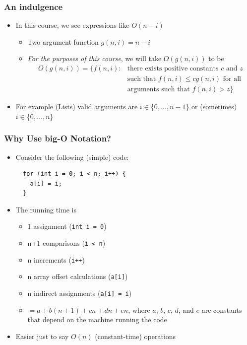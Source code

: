 \documentclass[xcolor=dvipsnames]{beamer}
\begin{document}
\begin{frame}
  \frametitle{An indulgence}

  \begin{itemize}
    \item In this course, we see expressions like $O(n-i)$
    \begin{itemize}
      \item Two argument function $g(n,i)=n-i$
      \item \emph{For the purposes of this course}, 
               we will take $O(g(n,i))$ to be
       \[ \begin{array}{ll} O(g(n,i)) = \{ f(n,i) : &
           \mbox{there exists positive constants $c$ and $z$} \\
           & \mbox{such that $f(n,i) \le cg(n,i)$ for all } \\
           & \mbox{arguments such that $f(n,i)>z$} \}\end{array} 
       \]
    \end{itemize}
    \item For example (Lists) valid arguments are $i\in\{0,\ldots,n-1\}$ or (sometimes) $i\in\{0,\ldots,n\}$
  \end{itemize}
\end{frame}

\begin{frame}[fragile]
  \frametitle{Why Use big-O Notation?}
   
  \begin{itemize}
    \item Consider the following (simple) code:
\begin{lstlisting}
  for (int i = 0; i < n; i++) {
    a[i] = i;
  } 
\end{lstlisting}
   \item<2-> The running time is 
   \begin{itemize}
      \item<3-> 1 assignment (\lstinline{int i = 0})
      \item<4-> n+1 comparisons (\lstinline{i < n})
      \item<5-> n increments (\lstinline{i++})
      \item<6-> n array offset calculations (\lstinline{a[i]})
      \item<7-> n indirect assignments (\lstinline{a[i] = i})
      \item<8-> ${}=a + b(n+1) + cn + dn + en$, where $a$, $b$, $c$, $d$, and $e$ are constants that depend on the machine running the code

   \end{itemize}
   \item<9-> Easier just to say $O(n)$ (constant-time) operations
 \end{itemize}

\end{frame}
\end{document}
